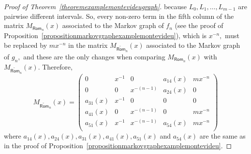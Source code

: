 \documentclass[a4paper, 11pt]{amsart}
\numberwithin{equation}{section}
\theoremstyle{customnumberedtheorem}
\theoremstyle{definitionwithbfnote}
\begin{document}
\begin{proof}[Proof of Theorem~\ref{theoremexamplemontevideugraph}]
because $L_0,L_1,\dots,L_{m-1}$
are pairwise different intervals.
So, every non-zero term in the fifth column of the matrix
$M_{\textsf{Rom}_n}(x)$ associated to the Markov graph of $f_n$
(see the proof of Proposition~\ref{propositionmarkovgraphexamplemontevideu}),
which is $x^{-n},$ must be replaced by $mx^{-n}$
in the matrix $M_{\widetilde{\textsf{Rom}}_n}(x)$ associated to the
Markov  graph of $g_n,$ and these are the only changes
when comparing $M_{\textsf{Rom}_n}(x)$ with
$M_{\widetilde{\textsf{Rom}}_n}(x)$.
Therefore,
\[
M_{\widetilde{\textsf{Rom}}_n}(x) = \begin{pmatrix}
           0    & x^{-1} &      0     & a_{14}(x) & mx^{-n} \\
           0    &     0  & x^{-(n-1)} & a_{24}(x) &   0 \\
      a_{31}(x) & x^{-1} &      0     &      0    &   0 \\
      a_{41}(x) &     0  & x^{-(n-1)} &      0    & mx^{-n} \\
      a_{51}(x) & x^{-1} & x^{-(n-1)} & a_{54}(x) & mx^{-n} \\
\end{pmatrix}
\]
where $a_{14}(x), a_{24}(x), a_{31}(x), a_{41}(x), a_{51}(x)$ and
$a_{54}(x)$ are the same as in the proof of
Proposition~\ref{propositionmarkovgraphexamplemontevideu}.


\end{proof}
\end{document}
